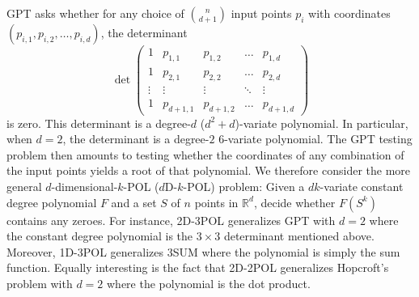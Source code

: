 GPT asks whether for any choice of \(n \choose d+1\) input points \(p_i\) with
coordinates \((p_{i,1} , p_{i,2} , \ldots, p_{i,d} )\),
the determinant
%
\begin{displaymath}
  \det\begin{pmatrix}
    1 & p_{1,1} & p_{1,2} & \hdots & p_{1,d} \\
    1 & p_{2,1} & p_{2,2} & \hdots & p_{2,d} \\
    \vdots & \vdots & \vdots & \ddots & \vdots \\
    1 & p_{d+1,1} & p_{d+1,2} & \hdots & p_{d+1,d}
  \end{pmatrix}
\end{displaymath}
is zero. This determinant is a degree-\(d\) (\(d^2 + d\))-variate polynomial.
In particular, when \(d=2\), the determinant is a degree-\(2\) \(6\)-variate
polynomial. The GPT testing problem then amounts to testing whether the
coordinates of any combination of the input points yields a root of that
polynomial. We therefore consider the more general \(d\)-dimensional-\(k\)-POL
(\(d\)D-\(k\)-POL) problem:
%
Given a \(dk\)-variate constant degree polynomial \(F\) and a set \(S\) of \(n\) points
in \(\mathbb{R}^d\), decide whether \(F(S^k)\) contains any zeroes.
%
For instance, 2D-3POL generalizes GPT with \(d=2\) where the constant degree
polynomial is the \(3 \times 3\) determinant mentioned above. Moreover, 1D-3POL
generalizes 3SUM where the polynomial is simply the sum function. Equally
interesting is the fact that 2D-2POL generalizes Hopcroft's problem with
\(d=2\) where the polynomial is the dot product.
